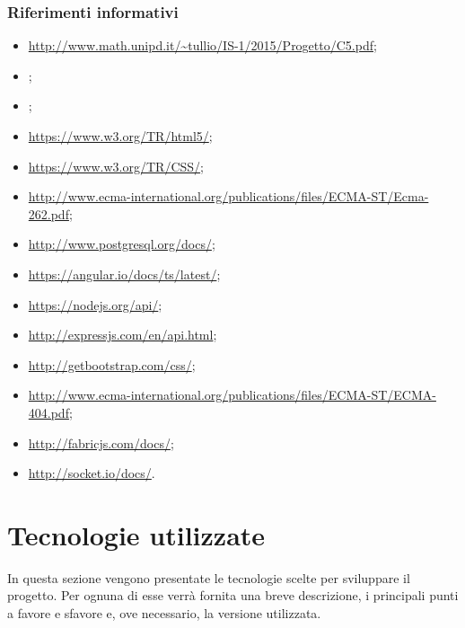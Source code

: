 \documentclass[a4paper, titlepage]{article}
\begin{document}
\subsubsection{Riferimenti informativi}
\begin{itemize}
\item {}  \url{http://www.math.unipd.it/~tullio/IS-1/2015/Progetto/C5.pdf};

\item {} \Gldoc;

\item {} \ARdoc;

\item {} \url{https://www.w3.org/TR/html5/};

\item {} \url{https://www.w3.org/TR/CSS/};

\item {} \url{http://www.ecma-international.org/publications/files/ECMA-ST/Ecma-262.pdf};

\item {} \url{http://www.postgresql.org/docs/};

\item {} \url{https://angular.io/docs/ts/latest/};

\item {} \url{https://nodejs.org/api/};

\item {} \url{http://expressjs.com/en/api.html};

\item {} \url{http://getbootstrap.com/css/};

\item {} \url{http://www.ecma-international.org/publications/files/ECMA-ST/ECMA-404.pdf};

\item {} \url{http://fabricjs.com/docs/};

\item {} \url{http://socket.io/docs/}.

\end{itemize}

\newpage

\section{Tecnologie utilizzate}
In questa sezione vengono presentate le tecnologie scelte per sviluppare il progetto. Per ognuna di esse verrà fornita una breve descrizione, i principali punti a favore e sfavore e, ove necessario, la versione utilizzata.
\end{document}

